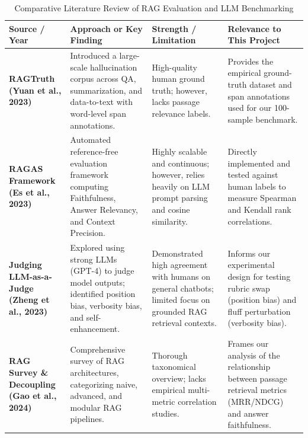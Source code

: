\documentclass[11pt,a4paper]{article}
\renewcommand{\arraystretch}{1.2}
\begin{document}
\begin{table}[htbp]
\centering
\caption{Comparative Literature Review of RAG Evaluation and LLM Benchmarking}
\label{tab:lit_review}
\footnotesize
\renewcommand{\arraystretch}{1.25}
\begin{tabularx}{\linewidth}{|>{\RaggedRight\bfseries}p{2.8cm}|>{\RaggedRight}X|>{\RaggedRight}X|>{\RaggedRight}X|}
\hline
\rowcolor{tableheader}
Source / Year & Approach or Key Finding & Strength / Limitation & Relevance to This Project \\
\hline
\textbf{RAGTruth} \newline (Yuan et al., 2023) \cite{ragtruth2023} & Introduced a large-scale hallucination corpus across QA, summarization, and data-to-text with word-level span annotations. & High-quality human ground truth; however, lacks passage relevance labels. & Provides the empirical ground-truth dataset and span annotations used for our 100-sample benchmark. \\
\hline
\textbf{RAGAS Framework} \newline (Es et al., 2023) \cite{es2023ragas} & Automated reference-free evaluation framework computing Faithfulness, Answer Relevancy, and Context Precision. & Highly scalable and continuous; however, relies heavily on LLM prompt parsing and cosine similarity. & Directly implemented and tested against human labels to measure Spearman and Kendall rank correlations. \\
\hline
\textbf{Judging LLM-as-a-Judge} \newline (Zheng et al., 2023) \cite{zheng2023judging} & Explored using strong LLMs (GPT-4) to judge model outputs; identified position bias, verbosity bias, and self-enhancement. & Demonstrated high agreement with humans on general chatbots; limited focus on grounded RAG retrieval contexts. & Informs our experimental design for testing rubric swap (position bias) and fluff perturbation (verbosity bias). \\
\hline
\textbf{RAG Survey \& Decoupling} \newline (Gao et al., 2024) \cite{gao2024retrieval} & Comprehensive survey of RAG architectures, categorizing naive, advanced, and modular RAG pipelines. & Thorough taxonomical overview; lacks empirical multi-metric correlation studies. & Frames our analysis of the relationship between passage retrieval metrics (MRR/NDCG) and answer faithfulness. \\
\hline
\end{tabularx}
\end{table}
\end{document}
